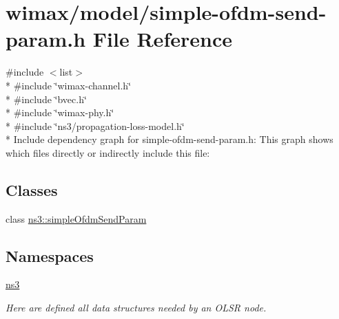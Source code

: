 \hypertarget{simple-ofdm-send-param_8h}{}\section{wimax/model/simple-\/ofdm-\/send-\/param.h File Reference}
\label{simple-ofdm-send-param_8h}
{\ttfamily \#include $<$list$>$}\\*
{\ttfamily \#include \char`\"{}wimax-\/channel.\+h\char`\"{}}\\*
{\ttfamily \#include \char`\"{}bvec.\+h\char`\"{}}\\*
{\ttfamily \#include \char`\"{}wimax-\/phy.\+h\char`\"{}}\\*
{\ttfamily \#include \char`\"{}ns3/propagation-\/loss-\/model.\+h\char`\"{}}\\*
Include dependency graph for simple-\/ofdm-\/send-\/param.h\+:
This graph shows which files directly or indirectly include this file\+:
\subsection*{Classes}
\begin{DoxyCompactItemize}
\item 
class \hyperlink{classns3_1_1simpleOfdmSendParam}{ns3\+::simple\+Ofdm\+Send\+Param}
\end{DoxyCompactItemize}
\subsection*{Namespaces}
\begin{DoxyCompactItemize}
\item 
 \hyperlink{namespacens3}{ns3}
\begin{DoxyCompactList}\small\item\em Here are defined all data structures needed by an O\+L\+SR node. \end{DoxyCompactList}\end{DoxyCompactItemize}

